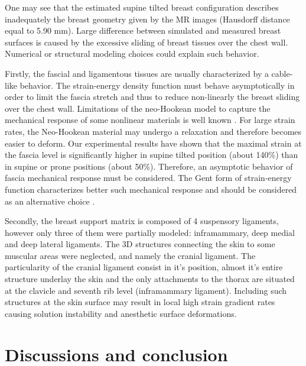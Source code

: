 One may see that the estimated supine tilted breast configuration describes inadequately the breast geometry given by the MR images (Hausdorff distance equal to 5.90 mm). Large difference between simulated and measured breast surfaces is caused by the excessive sliding of breast tissues over the chest wall. Numerical or structural modeling choices could explain such behavior.

Firstly, the fascial and ligamentous tissues are usually characterized by a cable-like behavior. The strain-energy density function must behave asymptotically in order to limit the fascia stretch and thus to reduce non-linearly the breast sliding over the chest wall. Limitations of the neo-Hookean model to capture the mechanical response of some nonlinear materials is well known \citep{kaliske_finite_1997}. For large strain rates, the Neo-Hookean material may undergo a relaxation and therefore becomes easier to deform.  Our experimental results have shown that the maximal strain at the fascia level is significantly higher in supine tilted position (about 140\%) than in supine or prone positions (about 50\%).  Therefore, an asymptotic behavior of fascia mechanical response must be considered.  The Gent  form of strain-energy function characterizes better such mechanical response \citep{gent_new_1996} and should be considered as an alternative choice .

Secondly, the breast support matrix is composed of 4 suspensory ligaments, however only three of them were partially modeled: inframammary, deep medial and deep lateral ligaments. The 3D structures connecting the skin to some muscular areas were neglected, and namely the cranial ligament.  The particularity  of the cranial ligament consist in it's position, almost it's entire structure underlay the skin and the only attachments to the thorax are situated at the clavicle and seventh rib level (inframammary ligament). Including such structures at the skin surface may result in local high strain gradient rates causing solution instability and anesthetic surface deformations. 


\section{Discussions and conclusion} \label{section:validation:discutionconclusion}

